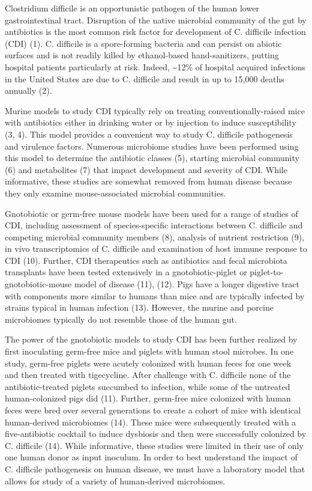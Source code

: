 \documentclass[11pt,]{article}
\begin{document}
Clostridium difficile is an opportunistic pathogen of the human lower
gastrointestinal tract. Disruption of the native microbial community of
the gut by antibiotics is the most common risk factor for development of
C. difficile infection (CDI) (1). C. difficile is a spore-forming
bacteria and can persist on abiotic surfaces and is not readily killed
by ethanol-based hand-sanitizers, putting hospital patients particularly
at risk. Indeed, \textasciitilde{}12\% of hospital acquired infections
in the United States are due to C. difficile and result in up to 15,000
deaths annually (2).

Murine models to study CDI typically rely on treating
conventionally-raised mice with antibiotics either in drinking water or
by injection to induce susceptibility (3, 4). This model provides a
convenient way to study C. difficile pathogenesis and virulence factors.
Numerous microbiome studies have been performed using this model to
determine the antibiotic classes (5), starting microbial community (6)
and metabolites (7) that impact development and severity of CDI. While
informative, these studies are somewhat removed from human disease
because they only examine mouse-associated microbial communities.

Gnotobiotic or germ-free mouse models have been used for a range of
studies of CDI, including assessment of species-specific interactions
between C. difficile and competing microbial community members (8),
analysis of nutrient restriction (9), in vivo transcriptomics of C.
difficile and examination of host immune response to CDI (10). Further,
CDI therapeutics such as antibiotics and fecal microbiota transplants
have been tested extensively in a gnotobiotic-piglet or
piglet-to-gnotobiotic-mouse model of disease (11), (12). Pigs have a
longer digestive tract with components more similar to humans than mice
and are typically infected by strains typical in human infection (13).
However, the murine and porcine microbiomes typically do not resemble
those of the human gut.

The power of the gnotobiotic models to study CDI has been further
realized by first inoculating germ-free mice and piglets with human
stool microbes. In one study, germ-free piglets were acutely colonized
with human feces for one week and then treated with tigecycline. After
challenge with C. difficile none of the antibiotic-treated piglets
succumbed to infection, while some of the untreated human-colonized pigs
did (11). Further, germ-free mice colonized with human feces were bred
over several generations to create a cohort of mice with identical
human-derived microbiomes (14). These mice were subsequently treated
with a five-antibiotic cocktail to induce dysbiosis and then were
successfully colonized by C. difficile (14). While informative, these
studies were limited in their use of only one human donor as input
inoculum. In order to best understand the impact of C. difficile
pathogenesis on human disease, we must have a laboratory model that
allows for study of a variety of human-derived microbiomes.
\end{document}
